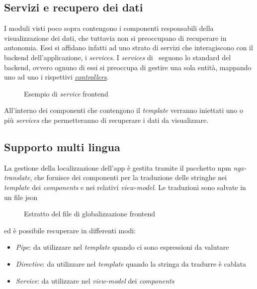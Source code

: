\subsection{Servizi e recupero dei dati}
\label{client:services}
I moduli visti poco sopra contengono i componenti responsabili della visualizzazione dei dati, che tuttavia non si preoccupano di recuperare in autonomia. Essi si affidano infatti ad uno strato di servizi che interagiscono con il \gls{backend} dell'applicazione, i \textit{services}.
I \textit{services} di \angular~seguono lo standard del \gls{backend}, ovvero ognuno di essi si preoccupa di gestire una sola entità, mappando uno ad uno i rispettivi \hyperref[server:controllers]{\textit{controllers}}.
 \begin{figure}[!h] 
 	\centering    
 	
 	\caption[Esempio di \textit{service} \gls{frontend}]{Esempio di \textit{service} \gls{frontend}}
 	\label{fig:client-service}
 \end{figure}
All'interno dei componenti che contengono il \textit{template} verranno iniettati uno o più \textit{services} che permetteranno di recuperare i dati da visualizzare.

 \subsection{Supporto multi lingua}
 La gestione della localizzazione dell'app è gestita tramite il pacchetto \acrshort{npm} \textit{ngx-translate}, che fornisce dei componenti per la traduzione delle stringhe nei \textit{template} dei \textit{components} e nei relativi \textit{view-model}. Le traduzioni sono salvate in un file \acrshort{json}
 \begin{figure}[H] 
	\centering    
	
	\caption[Estratto del file di globalizzazione \gls{frontend}]{Estratto del file di globalizzazione \gls{frontend}}
	\label{fig:client-globalization}
\end{figure}
\noindent
ed è possibile recuperare in differenti modi:
\begin{itemize}
	\item \textit{Pipe}: da utilizzare nel \textit{template} quando ci sono espressioni da valutare
	\item \textit{Directive}: da utilizzare nel \textit{template} quando la stringa da tradurre è cablata
	\item \textit{Service}: da utilizzare nel \textit{view-model} dei \textit{components}
\end{itemize}

